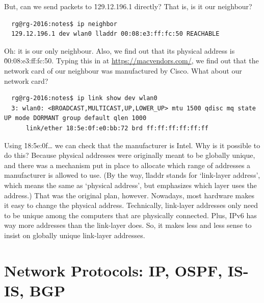 But, can we send packets to \.{129.12.196.1} directly?
That is, is it our neighbour?
{\footnotesize
\begin{verbatim}
  rg@rg-2016:notes$ ip neighbor
  129.12.196.1 dev wlan0 lladdr 00:08:e3:ff:fc:50 REACHABLE
\end{verbatim}
}\noindent
Oh: it is our only neighbour.
Also, we find out that its physical address is \.{00:08:e3:ff:fc:50}.
Typing this in at \url{https://macvendors.com/},
  we find out that the network card of our neighbour was manufactured by Cisco.
What about our network card?
{\footnotesize
\begin{verbatim}
  rg@rg-2016:notes$ ip link show dev wlan0
  3: wlan0: <BROADCAST,MULTICAST,UP,LOWER_UP> mtu 1500 qdisc mq state UP mode DORMANT group default qlen 1000
      link/ether 18:5e:0f:e0:bb:72 brd ff:ff:ff:ff:ff:ff
\end{verbatim}
}\noindent
Using \.{18:5e:0f\dots} we can check that the manufacturer is Intel.
Why is it possible to do this?
Because physical addresses were originally meant to be globally unique,
  and there was a mechanism put in place to allocate
    which range of addresses a manufacturer is allowed to use.
(By the way, \.{lladdr} stands for `link-layer address',
  which means the same as `physical address',
  but emphasizes which layer uses the address.)
That was the original plan, however.
Nowadays, most hardware makes it easy to change the physical address.
Technically,
  link-layer addresses only need to be unique among the computers
  that are physically connected.
Plus, IPv6 has way more addresses than the link-layer does.
So, it makes less and less sense to insist on globally unique link-layer addresses.


\section*{Network Protocols: IP, OSPF, IS-IS, BGP}

